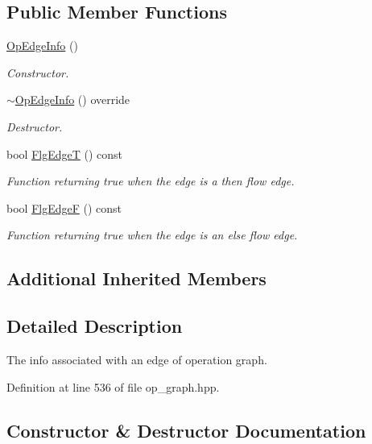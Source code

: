 \subsection*{Public Member Functions}
\begin{DoxyCompactItemize}
\item 
\hyperlink{classOpEdgeInfo_a0749ea4391a834ae41ad16e86a2992e8}{Op\+Edge\+Info} ()
\begin{DoxyCompactList}\small\item\em Constructor. \end{DoxyCompactList}\item 
\hyperlink{classOpEdgeInfo_ae9059c1e2b4b9f09b01ddfbb34e9bbfc}{$\sim$\+Op\+Edge\+Info} () override
\begin{DoxyCompactList}\small\item\em Destructor. \end{DoxyCompactList}\item 
bool \hyperlink{classOpEdgeInfo_a7409f855a6f551d2b520f79ad07a3e30}{Flg\+EdgeT} () const
\begin{DoxyCompactList}\small\item\em Function returning true when the edge is a then flow edge. \end{DoxyCompactList}\item 
bool \hyperlink{classOpEdgeInfo_abf631c945933fea3024f3c506178fca7}{Flg\+EdgeF} () const
\begin{DoxyCompactList}\small\item\em Function returning true when the edge is an else flow edge. \end{DoxyCompactList}\end{DoxyCompactItemize}
\subsection*{Additional Inherited Members}


\subsection{Detailed Description}
The info associated with an edge of operation graph. 

Definition at line 536 of file op\+\_\+graph.\+hpp.



\subsection{Constructor \& Destructor Documentation}
\mbox{\label{classOpEdgeInfo_a0749ea4391a834ae41ad16e86a2992e8}} 
